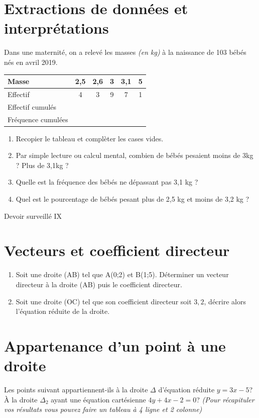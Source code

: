 \documentclass[french]{book}
\begin{document}
\section*{Extractions de données et interprétations}
Dans une maternité, on a relevé les masses \textit{(en kg)} à la naissance de 103 bébés nés en avril 2019.


\begin{center}
   \begin{tabular}{| l || c | c | c | c | c |}
     \hline
     Masse & 2,5 & 2,6 & 3 & 3,1 & 5 \\ \hline
     Effectif & 4 & 3 & 9 & 7 & 1 \\ \hline
	  Effectif cumulés & & & & & \\ \hline
	  Fréquence cumulées & & & & & \\
 
     \hline
   \end{tabular}
 \end{center}

\begin{enumerate}
\item Recopier le tableau et complèter les cases vides.
\item Par simple lecture ou calcul mental, combien de bébés pesaient moins de 3kg ? Plus de 3,1kg ? 
\item Quelle est la fréquence des bébés ne dépassant pas 3,1 kg ?
\item Quel est le pourcentage de bébés pesant plus de 2,5 kg et moins de 3,2 kg ? 
\end{enumerate}

\newpage

\begin{center}
\huge{ Devoir surveillé IX}
\end{center}

\section*{Vecteurs et coefficient directeur}
\begin{enumerate}
\item Soit une droite (AB) tel que A(0;2) et B(1;5). Déterminer un vecteur directeur à la droite (AB) puis le coefficient directeur.
\item Soit une droite (OC) tel que son coefficient directeur soit $3,2$, décrire alors l'équation réduite de la droite.
\end{enumerate}

\section*{Appartenance d'un point à une droite}
Les points suivant appartiennent-ils à la droite $\Delta$ d'équation réduite $y=3x-5$? À la droite $\Delta_2$ ayant une équation cartésienne $4y+4x-2=0$? \textit{ (Pour récapituler vos résultats vous pouvez faire un tableau à 4 ligne et 2 colonne) }
\end{document}
